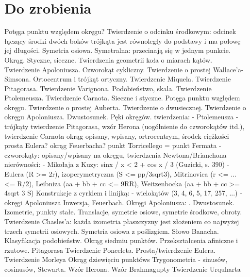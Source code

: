 
\section{Do zrobienia}
Potęga punktu względem okręgu?
Twierdzenie o odcinku środkowym: odcinek łączący środki dwóch boków trójkąta jest równoległy do podstawy i ma połowę jej długości.
Symetria osiowa.
Symetralna: przecinają się w jednym punkcie.
Okrąg.
Styczne, sieczne.
Twierdzenia geometrii koła o miarach kątów.
Twierdzenie Apoloniusza.
Czworokąt cykliczny.
Twierdzenie o prostej Wallace'a-Simsona.
Ortocentrum i trójkąt ortyczny.
Twierdzenie Miquela.
Twierdzenie Pitagorasa.
Twierdzenie Varignona.
Podobieństwo, skala.
Twierdzenie Ptolemeusza.
Twierdzenie Carnota.
Sieczne i styczne.
Potęga punktu względem okręgu.
Twierdzenie o prostej Auberta.
Twierdzenie o dwusiecznej.
Twierdzenie o okręgu Apoloniusza.
Dwustosunek.
Pęki okręgów.
twierdzenia:
- Ptolemeusza
- trójkąty
twierdzenie Pitagorasa, wzór Herona (uogólnienie do czworokątów itd.), twierdzenie Carnota
okrąg opisany, wpisany, ortrocentrym, środek ciężkości
prosta Eulera?
okrąg Feuerbacha?
punkt Torricellego = punkt Fermata
- czworokąty:
opisany/wpisany na okręgu, 
twierdzenia Newtona/Brianchona
nierówności:
- Mikołaja z Kuzy: sinx / x < 2 + cos x / 3 (Guzicki, s. 390)
- Eulera (R >= 2r), izoperymetryczna (S <= pp/3sqrt3), Mitrinovica (r <= ... <= R/2), Leibniza (aa + bb + cc <= 9RR), Weitzenbocka (aa + bb + cc >= 4sqrt 3 S)
Konstrukcje z cyrklem i linijką:
- wielokątów (3, 4, 6, 5, 17, 257, ...)
- okręgi Apoloniusza
Inwersja, Feuerbach.
Okręgi Apoloniusza: \cite[s. 444-461]{guzicki_2021}.
Dwustosunek.
Izometrie, punkty stałe.
Translacje, symetrie osiowe, symetrie środkowe, obroty.
Twierdzenie Chasles'a: każda izometria płaszczyzny jest złożeniem co najwyżej trzech symetrii osiowych.
Symetria osiowa z poślizgiem.
Słowo Banacha.
Klasyfikacja podobieństw.
Okrąg siedmiu punktów. %
Przekształcenia afiniczne i rzutowe.
Pitagorasa %
Twierdzenie Ponceleta.
Prosta/twierdzenie Eulera.
Twierdzenie Morleya
Okrąg dziewięciu punktóws
Trygonometria - sinusów, cosinusów, Stewarta.
Wzór Herona.
Wzór Brahmagupty
Twierdzenie Urquharta
